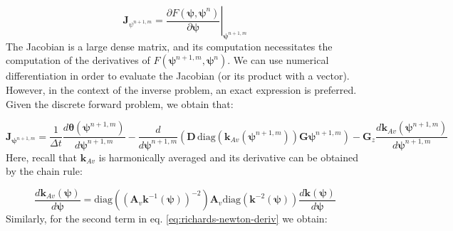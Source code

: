 \documentclass[preprint,review,3p,times,onecolumn,authoryear]{elsarticle}
\newcommand{\deriv}[2]{\frac{d #1}{d #2}}
\newcommand{\diag}[1]{\,\text{diag}\left( #1 \right)}
\newcommand{\bfD}{\mathbf{D}}
\newcommand{\bfJ}{\mathbf{J}}
\newcommand{\bfk}{\mathbf{k}}
\newcommand{\bftheta}{\boldsymbol{\theta}}
\newcommand{\bfpsi}{\boldsymbol{\psi}}
\newcommand{\nnm}{^{n+1,m}}
\newcommand{\n}{^{n}}
\newcommand{\FF}{F}
\begin{document}
\begin{equation}
\label{eq:richards-newton-deriv-setup}
\mathbf{J}_{\psi^{n+1,m}}  = \left. {\frac {\partial F(\boldsymbol{\psi},\boldsymbol{\psi}^n)}{\partial \boldsymbol{\psi}}} \right|_{\boldsymbol{\psi}^{n+1,m}}
\end{equation}
The Jacobian is a large dense matrix, and its computation necessitates the computation of the derivatives of $\FF(\bfpsi\nnm,\bfpsi\n)$. We can use numerical differentiation in order to evaluate the Jacobian (or its product with a vector). However, in the context of the inverse problem, an exact expression is preferred. Given the discrete forward problem, we obtain that:

\begin{equation}
\label{eq:richards-newton-deriv}
    \bfJ_{ \bfpsi\nnm} =
    \frac{1}{\Delta t} \deriv{\bftheta(\bfpsi\nnm)}{\bfpsi\nnm}
    -
    \deriv{}{\bfpsi\nnm}
    \left(
    \bfD
        \diag{\bfk_{Av}(\bfpsi\nnm)}
    \mathbf{G}\bfpsi\nnm
    \right)
    -
    \mathbf{G}_z
    \deriv{\bfk_{Av}(\bfpsi\nnm)}{\bfpsi\nnm}
\end{equation}
Here, recall that $\bfk_{Av}$ is harmonically averaged and its derivative can be obtained by the chain rule:

\begin{equation}
\label{eq:mass-matrix-kav-deriv}
\deriv{\mathbf{k}_{Av}(\boldsymbol{\psi})}{\boldsymbol{\psi}}
=
\text{diag}\left(
    (\mathbf{A}_v \mathbf{k}^{-1}(\boldsymbol{\psi}))^{-2} \right)
\mathbf{A}_v
\text{diag} \left(
    \mathbf{k}^{-2}(\boldsymbol{\psi}) \right)
\deriv{\mathbf{k}(\boldsymbol{\psi})}{\boldsymbol{\psi}}
\end{equation}
Similarly, for the second term in eq. \ref{eq:richards-newton-deriv} we obtain:
\end{document}
